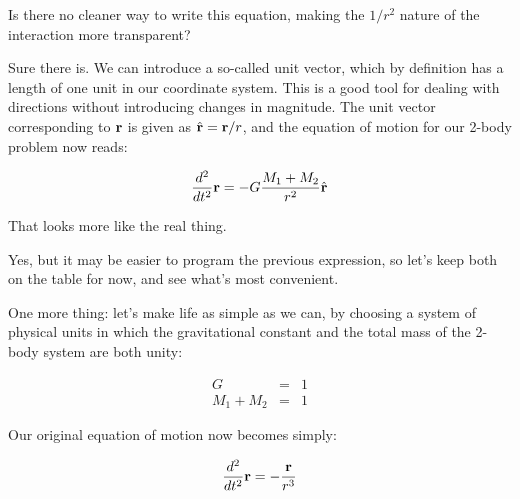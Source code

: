 \carol
Is there no cleaner way to write this equation, making the $1/r^2$
nature of the interaction more transparent?

\alice
Sure there is.  We can introduce a so-called unit vector, which by
definition has a length of one unit in our coordinate system.  This
is a good tool for dealing with directions without introducing changes
in magnitude.  The unit vector corresponding to ${\bf r}$ is given as
$ \hat{{\bf r}} = {\bf r} / r $, and the equation of motion for our 2-body
problem now reads:

\begin{equation}
\frac{d^2}{dt^2}{\bf r} = - G \frac{M_1 + M_2}{r^2}\hat{{\bf r}}
\end{equation}

\bob
That looks more like the real thing.

\carol
Yes, but it may be easier to program the previous expression, so let's
keep both on the table for now, and see what's most convenient.

\alice
One more thing: let's make life as simple as we can, by choosing a
system of physical units in which the gravitational constant and the
total mass of the 2-body system are both unity:

\begin{eqnarray}
G & = & 1 \\
M_1 + M_2 & = & 1
\end{eqnarray}

Our original equation of motion now becomes simply:

\begin{equation}
\frac{d^2}{dt^2}\br = - \frac{\br}{r^3} \label{newton-2-bodies}
\end{equation}

\cba

